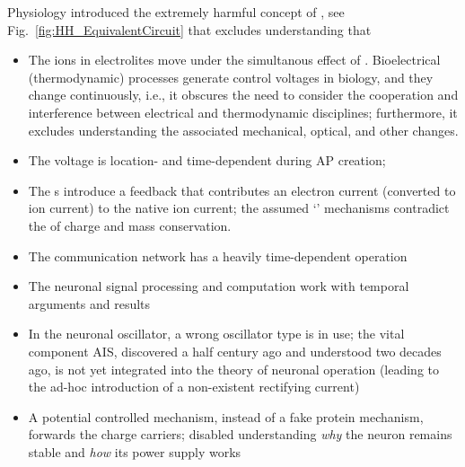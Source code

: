 Physiology introduced the extremely harmful concept of
\href{https://www.sas.upenn.edu/LabManuals/BBB251/NIA/NEUROLAB/APPENDIX/EQUAT.HH/equivcrt.htm}{}, see Fig.~\ref{fig:HH_EquivalentCircuit}
that excludes understanding that
 \begin{itemize}
 
 \item The ions in electrolites move under the simultanous effect of . Bioelectrical (thermodynamic) processes generate control voltages in biology, and they change continuously,
i.e., it obscures the need to consider the cooperation and interference between electrical and thermodynamic disciplines; furthermore, it excludes understanding the associated mechanical, optical, and other changes.

 \item The voltage is location- and time-dependent during AP creation;
 
 \item The s introduce a feedback that contributes an electron current (converted to ion current) to the native ion current; the assumed ‘’ mechanisms contradict the  of charge and mass conservation.

 \item The communication network has a heavily time-dependent operation 
 \item The neuronal signal processing and computation work with temporal arguments and results
 \item In the neuronal oscillator, a wrong oscillator type is in use; the 
 vital component
 \gls{AIS}, discovered a half century ago and understood two decades ago,
  is not yet integrated into the theory of neuronal operation (leading to the ad-hoc introduction of a non-existent rectifying current)
  \item A potential controlled mechanism, instead of a fake protein mechanism,
  forwards the charge carriers; disabled understanding \textit{why} the neuron remains stable and \textit{how} its power supply works
 \end{itemize}
 
